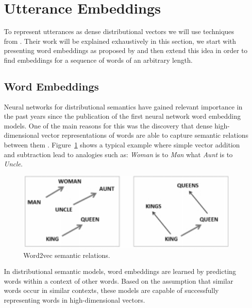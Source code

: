 \section{Utterance Embeddings}\label{sec:utt2vec}
To represent utterances as dense distributional vectors we will use techniques from . Their work will be explained exhaustively in this section, we start with presenting word embeddings as proposed by  and then extend this idea in order to find embeddings for a sequence of words of an arbitrary length.

\subsection{Word Embeddings}
Neural networks for distributional semantics have gained relevant importance in the past years since the publication of the first neural network word embedding models.
One of the main reasons for this was the discovery that dense high-dimensional vector representations of words are able to capture semantic relations between them .
Figure~\ref{fig:w2v_example} shows a typical example where simple vector addition and subtraction lead to analogies such as: \textit{Woman} is to \textit{Man} what \textit{Aunt} is to \textit{Uncle}.


\begin{figure}
\centering
\begin{minipage}{.4\textwidth}
\includegraphics[width=1\textwidth]{img/w2v_example}
\caption{Word2vec semantic relations.}
\label{fig:w2v_example}
\end{minipage}
\end{figure}

In distributional semantic models, word embeddings are learned by predicting words within a context of other words.
Based on the assumption that similar words occur in similar contexts, these models are capable of successfully representing words in high-dimensional vectors. 

